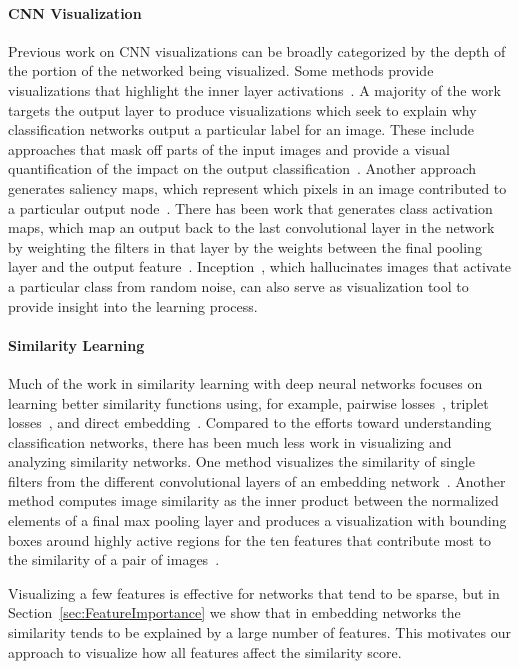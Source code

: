 \paragraph{CNN Visualization}
Previous work on CNN visualizations can be broadly categorized by
the depth of the portion of the networked being visualized. Some methods provide visualizations that highlight the inner layer activations~\cite{netdissect2017,visualization_techreport,scenecnn_iclr15}. A majority of the work targets the output layer to produce visualizations which seek to explain
why classification networks output a particular label for an image. These include approaches that mask off parts of the input images and provide a visual quantification of the impact on the output classification~\cite{ZeilerF13}. Another approach generates saliency maps, which represent which pixels in an image contributed to a particular output node~\cite{deepInside}. There has been work that generates class activation maps, which map an output back to the last convolutional layer in the network by weighting the filters in that layer by the weights between the final pooling layer and the output feature~\cite{cam}. Inception~\cite{szegedy2015going}, which hallucinates images that activate a particular class from random noise, can also serve as visualization tool to provide insight into the learning process. 

\paragraph{Similarity Learning}
Much of the work in similarity learning with deep neural networks focuses on learning better similarity functions using, for example, pairwise losses~\cite{sun2014deep,wang2014learning,yi2014deep}, triplet losses~\cite{HermansBeyer2017Arxiv,schroff2015facenet,song2016deep,ustinova2016learning}, and direct embedding~\cite{Proxy}. Compared to the efforts toward understanding classification networks, there has been much less work in visualizing and analyzing similarity networks. One method visualizes the similarity of single filters from the different convolutional layers of an embedding network~\cite{Ahmed_2015_CVPR}. Another method computes image similarity as the inner product between the normalized elements of a final max pooling layer and produces a visualization with bounding boxes around highly active regions for the ten features that contribute most to the similarity of a pair of images~\cite{RTC16,tolias2016rmac}. 

Visualizing a few features is effective for networks that tend to be sparse, but in Section~\ref{sec:FeatureImportance} we show that in embedding networks the similarity tends to be explained by a large number of features.  This motivates our approach to visualize how all features affect the similarity score.

